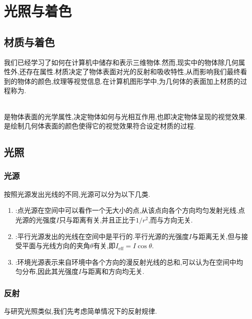 \documentclass{ctexart}
\begin{document}
\section{光照与着色}
\subsection{材质与着色}
我们已经学习了如何在计算机中储存和表示三维物体.然而,现实中的物体除几何属性外,还存在属性.材质决定了物体表面对光的反射和吸收特性,从而影响我们最终看到的物体的颜色,纹理等视觉信息.在计算机图形学中,为几何体的表面加上材质的过程称为.
\begin{definition}[材质与着色]\\
    是物体表面的光学属性,决定物体如何与光相互作用,也即决定物体呈现的视觉效果.\\
    是绘制几何体表面的颜色使得它的视觉效果符合设定材质的过程.
\end{definition}
\subsection{光照}
\subsubsection{光源}
按照光源发出光线的不同,光源可以分为以下几类.
\begin{enumerate}
    \item {}:点光源在空间中可以看作一个无大小的点,从该点向各个方向均匀发射光线.点光源的光强度$I$只与距离有关,并且正比于$1/r^2$,而与方向无关.
    \item {}:平行光源发出的光线在空间中是平行的.平行光源的光强度$I$与距离无关,但与接受平面与光线方向的夹角$\theta$有关,即$I_{\text{eff}}=I\cos\theta$.
    \item {}:环境光源表示来自环境中各个方向的漫反射光线的总和,可以认为在空间中均匀分布,因此其光强度$I$与距离和方向均无关.
\end{enumerate}
\subsubsection{反射}
与研究光照类似,我们先考虑简单情况下的反射规律.
\end{document}
